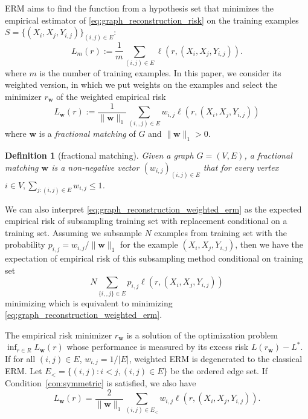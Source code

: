 \documentclass[letterpaper]{article} %
\def\LongVersion{}
\def\LongVersionEnd{}
\newtheorem{definition}{Definition}
\newcommand{\weight}{\mathbf{w}}
\newcommand{\bayeserror}{L^*}
\newcommand{\empiricalrisk}[1]{L_{#1}}
\newcommand{\lossf}{\ell}
\newcommand{\pair}[1]{(#1)}
\newcommand{\normo}[1]{\|#1\|_1}
\begin{document}
ERM aims to find the function from a hypothesis set that minimizes the empirical estimator of \eqref{eq:graph_reconstruction_risk} on the training examples $S=\{(X_i,X_j,Y_{i,j})\}_{\pair{i,j}\in E}$:
\begin{equation}
    \label{eq:graph_reconstruction_non_weighted_erm}
    \empiricalrisk{m}(r) := \frac{1}{m}\sum_{\pair{i,j}\in E} \lossf(r, (X_i,X_j, Y_{i,j})).
\end{equation}
where $m$ is the number of training examples. 
In this paper, we consider its weighted version, in which we put weights on the examples and select the minimizer $r_\weight{}$ of the weighted empirical risk
\begin{equation}
    \label{eq:graph_reconstruction_weighted_erm}
    \empiricalrisk{\weight}(r) := \frac{1}{\normo{\weight}} \sum_{\pair{i,,j}\in E} w_{i,j} \lossf(r, (X_i,X_j, Y_{i,j}))
\end{equation}
where $\weight$ is a \emph{fractional matching} of $G$ and $\normo{\weight{}} > 0$. 
\begin{definition}[fractional matching]
Given a graph $G=(V,E)$, a \emph{fractional matching} $\weight$ is a non-negative 
vector $(w_{i,j})_{\pair{i,j}\in E}$ that for every vertex $i\in V, \sum_{j:\pair{i,j}\in E}w_{i,j}\le 1$.
\end{definition}

\LongVersion
We can also interpret \eqref{eq:graph_reconstruction_weighted_erm} as the expected empirical risk of subsampling training set with replacement conditional on a training set.
Assuming we subsample $N$ examples from training set with the probability $p_{i,j}=w_{i,j}/\normo{\weight{}}$ for the example $(X_i,X_j,Y_{i,j})$, then we have the expectation of empirical risk of this subsampling method conditional on training set
\begin{equation}
    \label{eq:subsampling_erm}
    N\sum_{\{i,,j\}\in E} p_{i,j} \lossf(r, (X_i,X_j, Y_{i,j}))
\end{equation}
minimizing which is equivalent to minimizing \eqref{eq:graph_reconstruction_weighted_erm}.
\LongVersionEnd

\LongVersion
The empirical risk minimizer $r_\weight{}$ is a solution of the optimization problem $\inf_{r\in R}L_\weight{}(r)$ whose performance is measured by its excess risk $L(r_\weight{})-\bayeserror{}$.
If for all $\pair{i,j}\in E$, $w_{i,j}=1/|E|$, weighted ERM is degenerated to the classical ERM.
Let $E_<=\{\pair{i,j}: i<j, \pair{i,j}\in E\}$ be the ordered edge set. If Condition~\ref{con:symmetric} is satisfied, we also have
\begin{equation}
    \label{eq:symmetric_graph_reconstruction_imcomplete_erm}
    \empiricalrisk{\weight{}}(r) = \frac{2}{\normo{\weight{}}} \sum_{\pair{i,j}\in E_<} w_{i,j} \lossf(r, (X_i,X_j, Y_{i,j})).
\end{equation}
\LongVersionEnd
\end{document}
